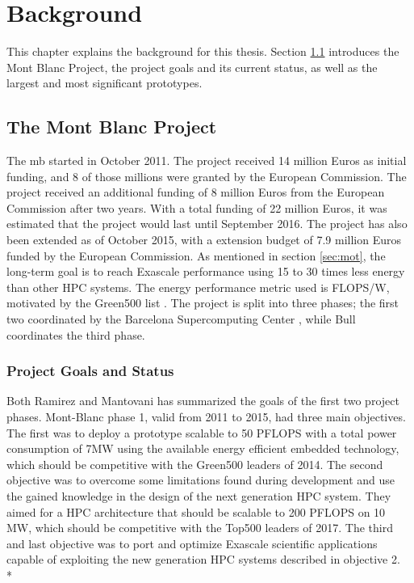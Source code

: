 \chapter{Background}
\label{ch:background}
This chapter explains the background for this thesis. Section \ref{sec:mbp} introduces the Mont Blanc Project, the project goals and its current status, as well as the largest and most significant prototypes.

\section{The Mont Blanc Project}
\label{sec:mbp}
The \gls{mb} \cite{m:MB} started in October 2011. The project received 14 million Euros as initial funding, and 8 of those millions were granted by the European Commission. The project received an additional funding of 8 million Euros from the European Commission after two years. With a total funding of 22 million Euros, it was estimated that the project would last until September 2016. The project has also been extended as of October 2015, with a extension budget of 7.9 million Euros funded by the European Commission. As mentioned in section \ref{sec:mot}, the long-term goal is to reach Exascale performance using 15 to 30 times less energy than other HPC systems. The energy performance metric used is FLOPS/W, motivated by the Green500 list \cite{m:Gr500}. The project is split into three phases; the first two coordinated by the Barcelona Supercomputing Center \cite{m:bsc}, while Bull \cite{m:bull} coordinates the third phase.


\subsection{Project Goals and Status}
Both Ramirez \cite{m:MB-PRACE-14} and Mantovani \cite{m:MB-15} has summarized the goals of the first two project phases. Mont-Blanc phase 1, valid from 2011 to 2015, had three main objectives. The first was to deploy a prototype scalable to 50 PFLOPS with a total power consumption of 7MW using the available energy efficient embedded technology, which should be competitive with the Green500 leaders of 2014. The second objective was to overcome some limitations found during development and use the gained knowledge in the design of the next generation HPC system. They aimed for a HPC architecture that should be scalable to 200 PFLOPS on 10 MW, which should be competitive with the Top500 leaders of 2017. The third and last objective was to port and optimize Exascale scientific applications capable of exploiting the new generation HPC systems described in objective 2. \\*

